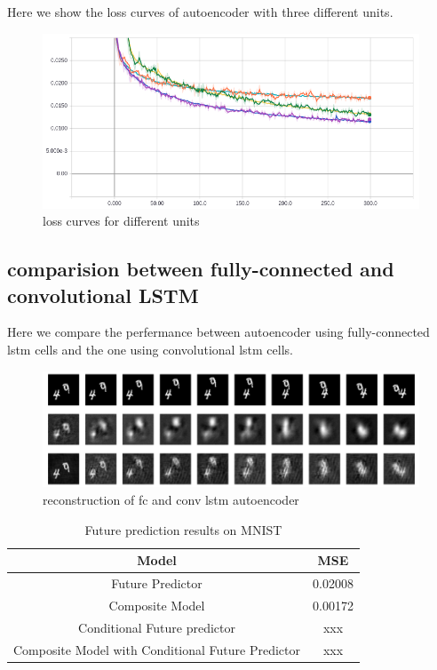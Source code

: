\documentclass[twoside,a4paper,article]{combine}
\begin{document}
Here we show the loss curves of autoencoder with three different units.
\begin{figure}[H]
    \includegraphics[width=\linewidth]{compare-units-loss}
    \caption{loss curves for different units}
    \label{fig:units-loss}
\end{figure}

\subsection{comparision between fully-connected and convolutional LSTM}
Here we compare the perfermance between autoencoder using fully-connected lstm cells and the one using convolutional lstm cells.
\begin{figure}[H]
    \includegraphics[width=\linewidth]{compare_fc_conv}
    \caption{reconstruction of fc and conv lstm autoencoder}
    \label{fig:fc-conv}
\end{figure}

\begin{table}[h!]
\centering
\begin{tabular}{ c c } 
    \hline
    Model & MSE \\
    \hline
    Future Predictor & 0.02008 \\
    Composite Model & 0.00172 \\
    Conditional Future predictor & xxx \\
    Composite Model with 
    Conditional Future Predictor & xxx \\
    \hline
    \end{tabular}
    \caption{Future prediction results on MNIST}
\label{table:variants}
\end{table}
\end{document}

